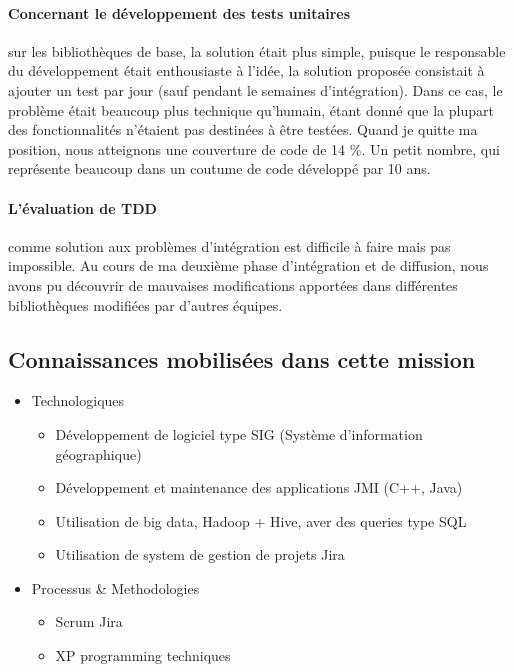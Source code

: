 \documentclass{resume} %
\begin{document}
\paragraph {Concernant le développement des tests unitaires} sur les bibliothèques  de base, la solution était plus simple, puisque le responsable du développement était enthousiaste à l'idée, la solution proposée consistait à ajouter un test par jour (sauf pendant le semaines d'intégration).
Dans ce cas, le problème était beaucoup plus technique qu'humain, étant donné que la plupart des fonctionnalités n'étaient pas destinées à être testées.
Quand je quitte ma position, nous atteignons une couverture de code de 14 \%. Un petit nombre, qui représente beaucoup dans un coutume de code développé par 10 ans.

\paragraph {L'évaluation de TDD} comme solution aux problèmes d'intégration est difficile à faire mais pas impossible. Au cours de ma deuxième phase d'intégration et de diffusion, nous avons pu découvrir de mauvaises modifications apportées dans différentes bibliothèques modifiées par d'autres équipes.

\subsection {Connaissances mobilisées dans cette mission }
	\begin{itemize} 				
			\item Technologiques 
					\begin{itemize}
						\item Développement de logiciel type SIG (Système d'information géographique)
						\item Développement et maintenance des applications JMI (C++, Java) 
						\item Utilisation de big data, Hadoop + Hive, aver des queries type SQL
						\item Utilisation de system de gestion de projets Jira
					\end {itemize}
			\item Processus \& Methodologies 
					\begin{itemize}
						\item Scrum Jira
						\item XP programming techniques
					\end {itemize}
		\end{itemize}
		
\end{document}
